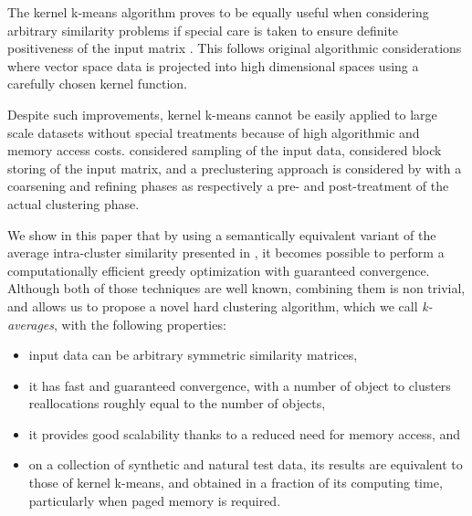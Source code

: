 \documentclass[natbib,smallextended]{svjour3}
\begin{document}
The kernel k-means algorithm proves to be equally useful when considering arbitrary similarity problems if special care is taken to ensure definite positiveness of the input matrix \citep{Roth:2003:OCP:960254.960291}. This follows original algorithmic considerations where vector space data is projected into high dimensional spaces using a carefully chosen kernel function.


Despite such improvements, kernel k-means cannot be easily applied to large scale datasets without special treatments because of high algorithmic and memory access costs.
\citet{Chitta:2011:AKK:2020408.2020558} considered sampling of the input data, \citet{1047453} considered block storing of the input matrix, and a preclustering  approach \citet{bradley98scaling} is considered by \citet{Kulis2008} with a coarsening and refining phases as respectively a pre- and post-treatment of the actual clustering phase.

We show in this paper that by using a semantically equivalent variant of the average intra-cluster similarity presented in \citep[Chapter 10.7]{Duda01}, it becomes possible to perform a computationally efficient greedy optimization \citep[Chapter 10.8]{Duda01} with guaranteed convergence. Although both of those techniques are well known, combining them is non trivial, and allows us to propose a novel hard clustering algorithm, which we call \emph{k-averages}, with the following properties:
\begin{itemize}
\item input data can be arbitrary symmetric similarity matrices,
\item it has fast and guaranteed convergence, with a number of object to clusters reallocations roughly equal to the number of objects,
\item it provides good scalability thanks to a reduced need for memory access, and
\item on a collection of synthetic and natural test data, its results are equivalent to those of kernel k-means, and obtained in a fraction of its computing time, particularly when paged memory is required.
\end{itemize}
\end{document}
